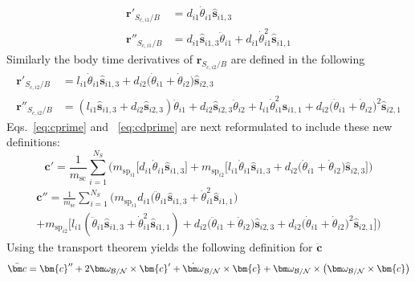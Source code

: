 \begin{align}
	\bm{r}'_{S_{c,i1}/B} &= d_{i1} \dot{\theta}_{i1} \bm{\hat{s}}_{i1,3}
	\label{eq:drcgspi1}
	\\
	\bm{r}''_{S_{c,i1}/B} &= d_{i1} \bm{\hat{s}}_{i1,3} \ddot{\theta}_{i1} + d_{i1} \dot{\theta}_{i1}^2 \bm{\hat{s}}_{i1,1}
	\label{eq:ddrcgspi1}
\end{align}
Similarly the body time derivatives of $\bm{r}_{S_{c,i2}/B}$ are defined in the following
\begin{align}
	\bm{r}'_{S_{c,i2}/B} &= l_{i1} \dot{\theta}_{i1} \bm{\hat{s}}_{i1,3} + d_{i2}\big(\dot{\theta}_{i1} + \dot{\theta}_{i2}\big)\bm{\hat{s}}_{i2,3}
	\label{eq:drcgspi2}
	\\
	\bm{r}''_{S_{c,i2}/B} &= (l_{i1} \bm{\hat{s}}_{i1,3} + d_{i2} \bm{\hat{s}}_{i2,3}) \ddot{\theta}_{i1} + d_{i2} \bm{\hat{s}}_{i2,3} \ddot{\theta}_{i2} + l_{i1} \dot{\theta}_{i1}^2 \bm{\hat{s}}_{i1,1} + d_{i2}\big(\dot{\theta}_{i1} + \dot{\theta}_{i2}\big)^2\bm{\hat{s}}_{i2,1}
	\label{eq:ddrcgspi2}
\end{align}
Eqs.~\eqref{eq:cprime} and ~\eqref{eq:cdprime} are next reformulated to include these new definitions:
\begin{equation}
	\bm{c}' = \frac{1}{m_{\text{sc}}}\sum_{i=1}^{N_{S}}\bigg(m_{\text{sp}_{i1}}\Big[d_{i1} \dot{\theta}_{i1} \bm{\hat{s}}_{i1,3}\Big]+m_{\text{sp}_{i2}}\Big[l_{i1} \dot{\theta}_{i1} \bm{\hat{s}}_{i1,3} + d_{i2}\big(\dot{\theta}_{i1} + \dot{\theta}_{i2}\big)\bm{\hat{s}}_{i2,3}\Big]\bigg)
	\label{eq:cprime2}
\end{equation}
\begin{multline}
	\bm{c}'' = \frac{1}{m_{\text{sc}}}\sum_{i=1}^{N_{S}}\bigg(m_{\text{sp}_{i1}}d_{i1} \big(\ddot{\theta}_{i1} \bm{\hat{s}}_{i1,3} + \dot{\theta}_{i1}^2 \bm{\hat{s}}_{i1,1}\big)\\
	+m_{\text{sp}_{i2}}\Big[l_{i1} \left(\ddot{\theta}_{i1} \bm{\hat{s}}_{i1,3} + \dot{\theta}_{i1}^2 \bm{\hat{s}}_{i1,1}\right) + d_{i2}\big(\ddot{\theta}_{i1} + \ddot{\theta}_{i2}\big)\bm{\hat{s}}_{i2,3} + d_{i2}\big(\dot{\theta}_{i1} + \dot{\theta}_{i2}\big)^2\bm{\hat{s}}_{i2,1}\Big]\bigg)
	\label{eq:cdprime2}
\end{multline}
Using the transport theorem\cite{schaub} yields the following definition for $\ddot{\bm c}$
\begin{equation}
	\ddot{\bm c} = \bm{c}'' + 2\bm\omega_{\cal B/N}\times\bm{c}'+\dot{\bm\omega}_{\cal B/N}\times\bm{c}+\bm\omega_{\cal B/N}\times\left(\bm\omega_{\cal B/N}\times\bm{c}\right)
	\label{eq:cddot}
\end{equation}
